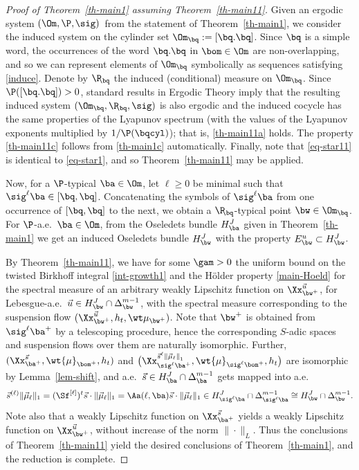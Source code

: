 \begin{proof}[Proof of Theorem~\ref{th-main1} assuming Theorem~\ref{th-main11}] Given an ergodic system $(\Om,\P,\mkern-1mu\sig)$~from the statement of Theorem~\ref{th-main1}, we consider the induced system on the cylinder set
$\Om_\bq:= [\bq.\bq]$.
Since $\bq$ is a simple word, the occurrences of the word $\bq.\bq$ in $\bom\in \Om$ are non-overlapping, and so
we can represent elements of $\Om_\bq$ symbolically as sequences satisfying \eqref{induce}. Denote by $\P_{\!\!\bq}$ the induced (conditional) measure on $\Om_\bq$. Since $\P([\bq.\bq])>0$, standard results in Ergodic Theory imply that the resulting induced system $(\Om_\bq,\P_{\!\!\bq},\sig)$ is also ergodic and the induced cocycle has the same properties of the Lyapunov spectrum (with the values of the Lyapunov exponents multiplied by $1/\P(\bqcyl)$); that is, \eqref{th-main11a} holds. The property \eqref{th-main11c} follows from \eqref{th-main1c} automatically. Finally, note that \eqref{eq-star11} is identical to \eqref{eq-star1}, and
so Theorem~\ref{th-main11} may be applied.

Now, for a $\P$-typical $\ba\in \Om$, let $\ell\ge 0$ be minimal such that $\sig^\ell\ba \in [\bq,\bq]$. Concatenating the symbols of $\sig^\ell\ba$ from one occurrence of $[\bq,\bq]$ to the next, we
obtain a $\P_{\!\!\bq}$-typical point $\bw\in \Om_\bq$.
For $\P$-a.e.\ $\ba\in \Om$, from the Oseledets bundle $H_\ba^J$ given in Theorem~\ref{th-main1} we get an induced Oseledets bundle $H_\bw^J$ with the property $E^u_\bw \subset H_\bw^J$.

By
Theorem~\ref{th-main11}, we have for some $\gam>0$ the uniform bound on the twisted Birkhoff integral \eqref{int-growth1} and the Hölder property \eqref{main-Hoeld}
for the spectral measure of an arbitrary
weakly Lipschitz function on $\Xx_{\bw^+}^{\vec u}$, for Lebesgue-a.e.\ $\vec u\in H_\bw^J\cap \Delta_\bw^{m-1}$, with the spectral measure corresponding to the suspension flow
$(\Xx_{\bw^+}^{\vec u}, h_t,\wt\mu_{\bw^+})$. Note that $\bw^+$ is obtained from $\sig^\ell\ba^+$ by a telescoping procedure, hence the corresponding $S$-adic spaces and suspension flows over them are naturally isomorphic. Further, $(\Xx_{\ba^+}^{\vec{s}},\wt{\mu}_{\bom^+},h_t)$ and $\bigl(\Xx_{\sig^\ell\ba^+}^{\vec{s}^{\ell}{\|\vec \mu_\ell\|}_1},\wt{\mu}_{\sig^\ell\bom^+},h_t\bigr)$ are isomorphic
by Lemma~\ref{lem-shift}, and a.e.\ $\vec s\in H^J_\ba\cap \Delta_\ba^{m-1}$ gets mapped into a.e.
\[
\vec s^{(\ell)}\|\vec\mu_\ell\|_1 = (\Sf^{[\ell]})^t \vec s \cdot\|\vec\mu_\ell\|_1 = \Aa(\ell,\ba)\vec s\cdot \|\vec\mu_\ell\|_1\in H_{\sig^\ell\ba}^J\cap \Delta^{m-1}_{\sig^\ell\ba}\cong H_\bw^J\cap \Delta_\bw^{m-1}.
\]
Note also that a weakly Lipschitz function on $\Xx_{\ba^+}^{\vec{s}}$ yields a weakly Lipschitz function on $\Xx_{\bw^+}^{\vec u}$, without increase of the norm $\|\cdot\|_L$. Thus the conclusions of Theorem~\ref{th-main11} yield the desired conclusions of Theorem~\ref{th-main1}, and the
reduction is complete.
\end{proof}

